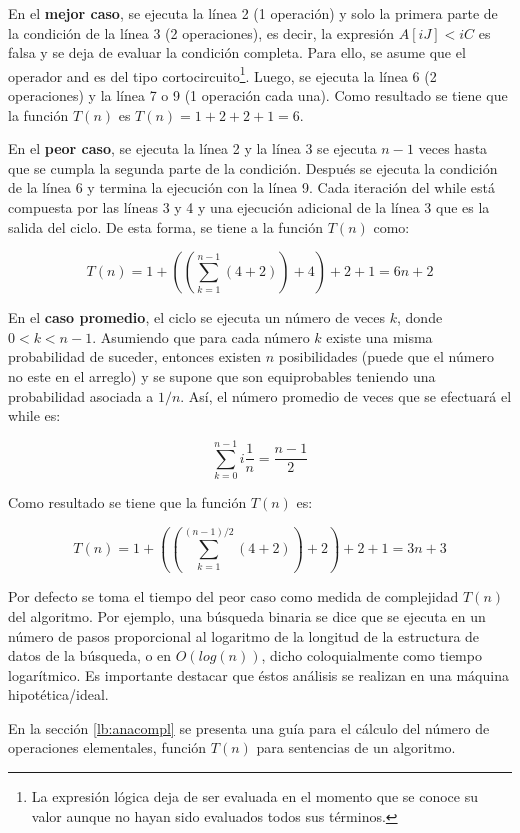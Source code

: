 En el \textbf{mejor caso}, se ejecuta la línea 2 (1 operación) y solo la primera parte de la condición de la línea 3 (2 operaciones), es decir, la expresión $A[iJ] < iC$ es falsa y se deja de evaluar la condición completa. Para ello, se asume que el operador and es del tipo cortocircuito\footnote{La expresión lógica deja de ser evaluada en el momento que se conoce su valor aunque no hayan sido evaluados todos sus términos.}. Luego, se ejecuta la línea 6 (2 operaciones) y la línea 7 o 9 (1 operación cada una). Como resultado se tiene que la función $T(n)$ es $T(n) = 1 + 2 + 2 + 1 = 6$.

En el \textbf{peor caso}, se ejecuta la línea 2 y la línea 3 se ejecuta $n-1$ veces hasta que se cumpla la segunda parte de la condición. Después se ejecuta la condición de la línea 6 y termina la ejecución con la línea 9. Cada iteración del while está compuesta por las líneas 3 y 4 y una ejecución adicional de la línea 3 que es la salida del ciclo. De esta forma, se tiene a la función $T(n)$ como:

$$T(n) = 1 + ((\sum_{k=1}^{n-1}{(4+2)}) + 4) + 2 + 1 = 6n + 2$$

En el \textbf{caso promedio}, el ciclo se ejecuta un número de veces $k$, donde $0 < k < n-1$. Asumiendo que para cada número $k$ existe una misma probabilidad de suceder, entonces existen $n$ posibilidades (puede que el número no este en el arreglo) y se supone que son equiprobables teniendo una probabilidad asociada a $1/n$. Así, el número promedio de veces que se efectuará el while es:

$$\sum_{k=0}^{n-1}{i\frac{1}{n}} = \frac{n-1}{2}$$

Como resultado se tiene que la función $T(n)$ es:

$$T(n) = 1 + ((\sum_{k=1}^{(n-1)/2}{(4+2)}) + 2) + 2 + 1 = 3n + 3$$

Por defecto se toma el tiempo del peor caso como medida de complejidad $T(n)$ del algoritmo. Por ejemplo, una búsqueda binaria se dice que se ejecuta en un número de pasos proporcional al logaritmo de la longitud de la estructura de datos de la búsqueda, o en $O(log(n))$, dicho coloquialmente como tiempo logarítmico. Es importante destacar que éstos análisis se realizan en una máquina hipotética/ideal.

En la sección \ref{lb:anacompl} se presenta una guía para el cálculo del número de operaciones elementales, función $T(n)$ para sentencias de un algoritmo.

